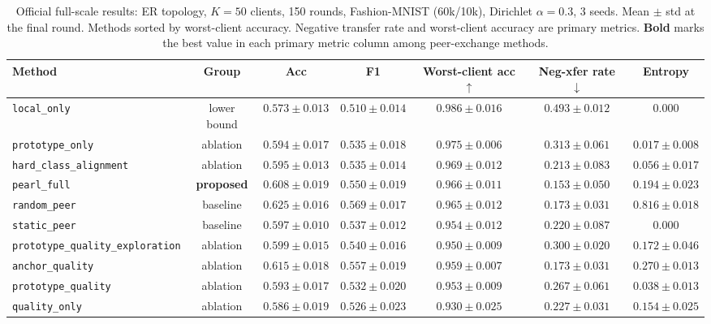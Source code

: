 \documentclass[conference]{IEEEtran}
\begin{document}
\begin{table}[t]
\centering
\caption{Official full-scale results: ER topology, $K=50$ clients, 150 rounds, Fashion-MNIST (60k/10k), Dirichlet $\alpha=0.3$, 3 seeds. Mean $\pm$ std at the final round. Methods sorted by worst-client accuracy. Negative transfer rate and worst-client accuracy are primary metrics. \textbf{Bold} marks the best value in each primary metric column among peer-exchange methods.}
\label{tab:official_results}
\renewcommand{\arraystretch}{1.18}
\setlength{\tabcolsep}{4pt}
\begin{tabular}{lcccccc}
\toprule
\textbf{Method} & \textbf{Group} & \textbf{Acc} & \textbf{F1} & \textbf{Worst-client acc} $\uparrow$ & \textbf{Neg-xfer rate} $\downarrow$ & \textbf{Entropy} \\
\midrule
\texttt{local\_only}                   & lower bound  & $0.573\pm0.013$ & $0.510\pm0.014$ & $0.986\pm0.016$ & $0.493\pm0.012$ & $0.000$ \\
\texttt{prototype\_only}               & ablation     & $0.594\pm0.017$ & $0.535\pm0.018$ & $0.975\pm0.006$ & $0.313\pm0.061$ & $0.017\pm0.008$ \\
\texttt{hard\_class\_alignment}        & ablation     & $0.595\pm0.013$ & $0.535\pm0.014$ & $0.969\pm0.012$ & $0.213\pm0.083$ & $0.056\pm0.017$ \\
\texttt{pearl\_full}                   & \textbf{proposed} & $0.608\pm0.019$ & $0.550\pm0.019$ & $\mathbf{0.966\pm0.011}$ & $\mathbf{0.153\pm0.050}$ & $0.194\pm0.023$ \\
\texttt{random\_peer}                  & baseline     & $0.625\pm0.016$ & $0.569\pm0.017$ & $0.965\pm0.012$ & $0.173\pm0.031$ & $0.816\pm0.018$ \\
\texttt{static\_peer}                  & baseline     & $0.597\pm0.010$ & $0.537\pm0.012$ & $0.954\pm0.012$ & $0.220\pm0.087$ & $0.000$ \\
\texttt{prototype\_quality\_exploration} & ablation   & $0.599\pm0.015$ & $0.540\pm0.016$ & $0.950\pm0.009$ & $0.300\pm0.020$ & $0.172\pm0.046$ \\
\texttt{anchor\_quality}               & ablation     & $0.615\pm0.018$ & $0.557\pm0.019$ & $0.959\pm0.007$ & $0.173\pm0.031$ & $0.270\pm0.013$ \\
\texttt{prototype\_quality}            & ablation     & $0.593\pm0.017$ & $0.532\pm0.020$ & $0.953\pm0.009$ & $0.267\pm0.061$ & $0.038\pm0.013$ \\
\texttt{quality\_only}                 & ablation     & $0.586\pm0.019$ & $0.526\pm0.023$ & $0.930\pm0.025$ & $0.227\pm0.031$ & $0.154\pm0.025$ \\
\bottomrule
\end{tabular}
\end{table}
\end{document}
